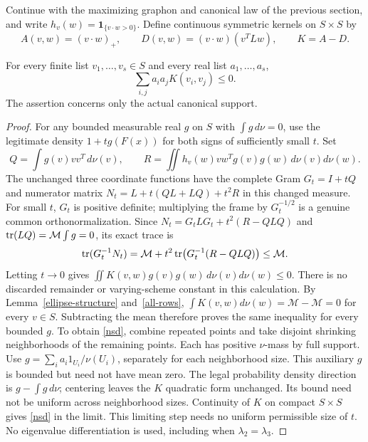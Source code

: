 Continue with the maximizing graphon and canonical law of the previous
section, and write $h_v(w)=\mathbf1_{\{v\cdot w>0\}}$. Define continuous symmetric kernels on $S\times S$ by
\[
 A(v,w)=(v\cdot w)_+,\qquad
 D(v,w)=(v\cdot w)(v^TLw),\qquad K=A-D.
\]
\begin{theorem}\label{negative}
For every finite list $v_1,\ldots,v_s\in S$ and every real list $a_1,\ldots,a_s$,
\begin{equation}
 \sum_{i,j}a_i a_j K(v_i,v_j)\le0. \label{nsd}
\end{equation}
The assertion concerns only the actual canonical support.
\end{theorem}
\begin{proof}
For any bounded measurable real $g$ on $S$ with $\int g\,d\nu=0$, use the legitimate density
$1+tg(F(x))$ for both signs of sufficiently small $t$.
Set
\[
 Q=\int g(v)vv^T\,d\nu(v),\qquad
 R=\iint h_v(w)vw^Tg(v)g(w)\,d\nu(v)d\nu(w).
\]
The unchanged three coordinate functions have the complete Gram $G_t=I+tQ$
and numerator matrix $N_t=L+t(QL+LQ)+t^2R$ in this changed measure.
For small $t$, $G_t$ is positive definite; multiplying the frame by $G_t^{-1/2}$
is a genuine common orthonormalization. Since
$N_t=G_tLG_t+t^2(R-QLQ)$ and $\operatorname{tr}(LQ)=\mathcal M\int g=0$, its exact trace is
\begin{equation}
 \operatorname{tr}(G_t^{-1}N_t)=\mathcal M+t^2\operatorname{tr}\bigl(G_t^{-1}(R-QLQ)\bigr)\le \mathcal M. \label{density}
\end{equation}
Letting $t\to0$ gives $\iint K(v,w)g(v)g(w)\,d\nu(v)d\nu(w)\le0$.
There is no discarded remainder or varying-scheme constant in this calculation.
By Lemma~\ref{ellipse-structure} and~\eqref{all-rows}, $\int K(v,w)d\nu(w)=\mathcal M-\mathcal M=0$ for every $v\in S$.
Subtracting the mean therefore proves the same inequality for every bounded $g$.
To obtain \eqref{nsd}, combine repeated points and take disjoint shrinking
neighborhoods of the remaining points. Each has positive $\nu$-mass by full support.
Use $g=\sum_i a_i1_{U_i}/\nu(U_i)$, separately for each neighborhood size.
This auxiliary $g$ is bounded but need not have mean zero. The legal probability
density direction is $g-\int g\,d\nu$; centering leaves the $K$ quadratic form unchanged.
Its bound need not be uniform across neighborhood sizes.
Continuity of $K$ on compact $S\times S$ gives \eqref{nsd} in the limit.
This limiting step needs no uniform permissible size of $t$.
No eigenvalue differentiation is used, including when $\lambda_2=\lambda_3$.
\end{proof}
